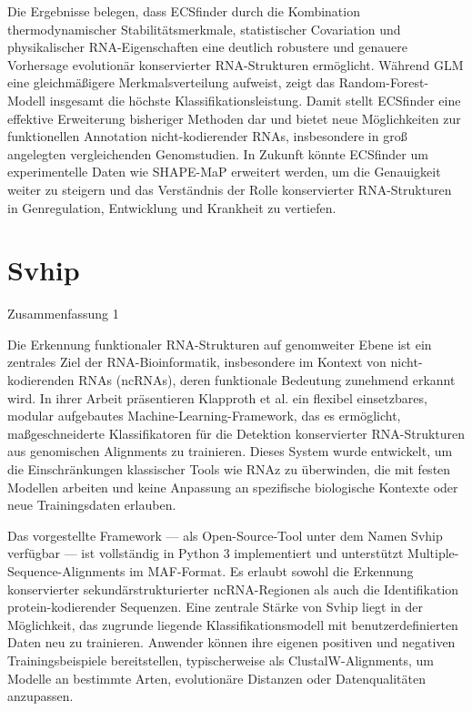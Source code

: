 \documentclass{article}
\begin{document}
\begin{large}
\begin{large}
\begin{large}
Die Ergebnisse belegen, dass ECSfinder durch die Kombination thermodynamischer Stabilitätsmerkmale, statistischer Covariation und physikalischer RNA-Eigenschaften eine deutlich robustere und genauere Vorhersage evolutionär konservierter RNA-Strukturen ermöglicht. Während GLM eine gleichmäßigere Merkmalsverteilung aufweist, zeigt das Random-Forest-Modell insgesamt die höchste Klassifikationsleistung. Damit stellt ECSfinder eine effektive Erweiterung bisheriger Methoden dar und bietet neue Möglichkeiten zur funktionellen Annotation nicht-kodierender RNAs, insbesondere in groß angelegten vergleichenden Genomstudien. In Zukunft könnte ECSfinder um experimentelle Daten wie SHAPE-MaP erweitert werden, um die Genauigkeit weiter zu steigern und das Verständnis der Rolle konservierter RNA-Strukturen in Genregulation, Entwicklung und Krankheit zu vertiefen.

\section{Svhip}

Zusammenfassung 1

Die Erkennung funktionaler RNA-Strukturen auf genomweiter Ebene ist ein zentrales Ziel der RNA-Bioinformatik, insbesondere im Kontext von nicht-kodierenden RNAs (ncRNAs), deren funktionale Bedeutung zunehmend erkannt wird. In ihrer Arbeit präsentieren Klapproth et al. ein flexibel einsetzbares, modular aufgebautes Machine-Learning-Framework, das es ermöglicht, maßgeschneiderte Klassifikatoren für die Detektion konservierter RNA-Strukturen aus genomischen Alignments zu trainieren. Dieses System wurde entwickelt, um die Einschränkungen klassischer Tools wie RNAz zu überwinden, die mit festen Modellen arbeiten und keine Anpassung an spezifische biologische Kontexte oder neue Trainingsdaten erlauben.

Das vorgestellte Framework — als Open-Source-Tool unter dem Namen Svhip verfügbar — ist vollständig in Python 3 implementiert und unterstützt Multiple-Sequence-Alignments im MAF-Format. Es erlaubt sowohl die Erkennung konservierter sekundärstrukturierter ncRNA-Regionen als auch die Identifikation protein-kodierender Sequenzen. Eine zentrale Stärke von Svhip liegt in der Möglichkeit, das zugrunde liegende Klassifikationsmodell mit benutzerdefinierten Daten neu zu trainieren. Anwender können ihre eigenen positiven und negativen Trainingsbeispiele bereitstellen, typischerweise als ClustalW-Alignments, um Modelle an bestimmte Arten, evolutionäre Distanzen oder Datenqualitäten anzupassen.


\end{large}
\end{large}
\end{large}
\end{document}
